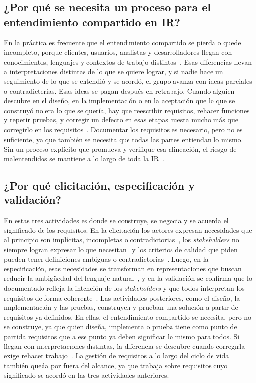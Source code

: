 \documentclass[12pt,letterpaper,oneside]{report}
\begin{document}
\subsection{¿Por qué se necesita un proceso para el entendimiento compartido en IR?}
En la práctica es frecuente que el entendimiento compartido se pierda o quede
incompleto, porque clientes, usuarios, analistas y desarrolladores llegan con
conocimientos, lenguajes y contextos de trabajo
distintos~\cite{grande2024devops}. Esas diferencias llevan a interpretaciones
distintas de lo que se quiere lograr, y si nadie hace un seguimiento de lo que
se entendió y se acordó, el grupo avanza con ideas parciales o contradictorias.
Esas ideas se pagan después en retrabajo. Cuando alguien descubre en el diseño,
en la implementación o en la aceptación que lo que se construyó no era lo que se
quería, hay que reescribir requisitos, rehacer funciones y repetir pruebas, y
corregir un defecto en esas etapas cuesta mucho más que corregirlo en los
requisitos~\cite{boehm2001defect}. Documentar los requisitos es necesario,
pero no es suficiente, ya que también se necesita que todas las partes entiendan
lo mismo. Sin un proceso explícito que promueva y verifique esa alineación, el
riesgo de malentendidos se mantiene a lo largo de toda la IR~\cite{iso29148}.

\subsection{¿Por qué elicitación, especificación y validación?}
En estas tres actividades es donde se construye, se negocia y se acuerda el
significado de los requisitos. En la elicitación los actores expresan
necesidades que al principio son implícitas, incompletas o
contradictorias~\cite{nuseibeh2000roadmap}, los \textit{stakeholders} no siempre
logran expresar lo que necesitan~\cite{laporte2023} y los criterios de calidad
que piden pueden tener definiciones ambiguas o
contradictorias~\cite{mattmann2015quality}. Luego, en la especificación, esas
necesidades se transforman en representaciones que buscan reducir la ambigüedad
del lenguaje natural~\cite{iso29148,ribeiro2020}, y en la validación se confirma
que lo documentado refleja la intención de los \textit{stakeholders} y que todos
interpretan los requisitos de forma coherente~\cite{iso29148}. Las actividades
posteriores, como el diseño, la
implementación y las pruebas, construyen y prueban una solución a partir de
requisitos ya definidos. En ellas, el entendimiento compartido se necesita, pero
no se construye, ya que quien diseña, implementa o prueba tiene como punto de partida requisitos que
a ese punto ya deben significar lo mismo para todos. Si llegan con
interpretaciones distintas, la diferencia se descubre cuando corregirla exige
rehacer trabajo~\cite{agredo2022thesis,boehm2001defect}. La gestión de
requisitos a lo largo del ciclo de vida también queda por fuera del alcance, ya
que trabaja sobre requisitos cuyo significado se acordó en las tres actividades
anteriores.
\end{document}
